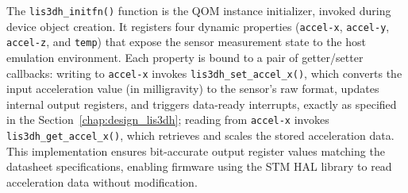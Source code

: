 The \texttt{lis3dh\_initfn()} function is the QOM instance initializer, invoked 
during device object creation. It registers four dynamic properties (\texttt{accel-x}, 
\texttt{accel-y}, \texttt{accel-z}, and \texttt{temp}) that expose the sensor 
measurement state to the host emulation environment. Each property is bound to a pair 
of getter/setter callbacks: writing to \texttt{accel-x} invokes 
\texttt{lis3dh\_set\_accel\_x()}, which converts the input acceleration value (in 
milligravity) to the sensor's raw format, updates internal output registers, and 
triggers data-ready interrupts, exactly as specified in the Section~\ref{chap:design_lis3dh}; 
reading from \texttt{accel-x} invokes \texttt{lis3dh\_get\_accel\_x()}, which retrieves 
and scales the stored acceleration data. This implementation ensures bit-accurate output 
register values matching the datasheet specifications, enabling firmware using the STM 
HAL library to read acceleration data without modification.



